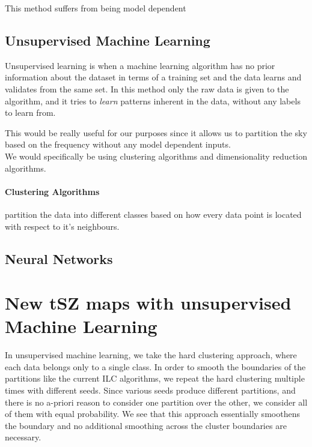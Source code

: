 This method suffers from being model dependent 


\subsection{Unsupervised Machine Learning}
Unsupervised learning is when a machine learning algorithm has no prior information about the dataset in terms of a training set and
the data learns and validates from the same set. In this method only the raw data is given to the algorithm, and it tries to \emph{learn}
patterns inherent in the data, without any labels to learn from.

This would be really useful for our purposes since it allows us to partition the sky based on the frequency without any model
dependent inputs.
\\
We would specifically be using clustering algorithms and dimensionality reduction algorithms.
\paragraph{Clustering Algorithms} partition the data into different classes based on how every data point
is located with respect to it's neighbours. 

\subsection{Neural Networks}


\section{New tSZ maps with unsupervised Machine Learning}
\label{tSZmaps}
In unsupervised machine learning, we take the hard clustering approach,
where each data belongs only to a single class. In order to smooth the boundaries of the partitions
like the current ILC algorithms, we repeat the hard clustering multiple times with different seeds.
Since various seeds produce different partitions, and there is no a-priori reason to consider one
partition over the other, we consider all of them with equal probability. We see that this approach
essentially smoothens the boundary and no additional smoothing across the cluster boundaries are
necessary. 

